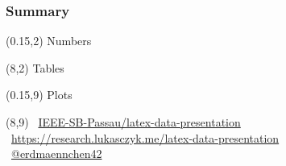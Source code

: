 \documentclass[t]{beamer}
\begin{document}
\begin{frame}
  \frametitle{Summary}
  \begin{textblock}{0}(0.15,2)
    Numbers 
  \end{textblock}
  \begin{textblock}{0}(8,2)
    Tables 
  \end{textblock}

  \begin{textblock}{0}(0.15,9)
    Plots
  \end{textblock}
  \begin{textblock}{6}(8,9)
    \faGithub~\href{https://github.com/IEEE-SB-Passau/latex-data-presentation}%
      {IEEE-SB-Passau/latex-data-presentation}\\
    \faCode~\href{https://research.lukasczyk.me/latex-data-presentation}%
      {https://research.lukasczyk.me/latex-data-presentation}\\
    \faTwitter~\href{https://twitter.com/erdmaennchen42}{@erdmaennchen42}
  \end{textblock}
\end{frame}
\end{document}
